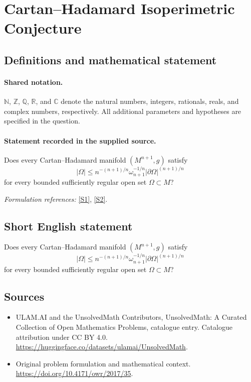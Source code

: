 \documentclass[11pt]{article}
\newcommand{\sref}[2]{\hyperlink{source:#1:#2}{[S#2]}}
\begin{document}
\section{Cartan–Hadamard Isoperimetric Conjecture}\label{statement}

\subsection{Definitions and mathematical statement}

\paragraph{Shared notation.}$\mathbb N$, $\mathbb Z$, $\mathbb Q$, $\mathbb R$, and $\mathbb C$ denote the natural numbers, integers, rationals, reals, and complex numbers, respectively. All additional parameters and hypotheses are specified in the question.


\paragraph{Statement recorded in the supplied source.}
Does every Cartan–Hadamard manifold $(M^{n+1},g)$ satisfy
$$
|\Omega|\leq n^{-(n+1)/n}\omega_{n+1}^{-1/n}|\partial\Omega|^{(n+1)/n}
$$
for every bounded sufficiently regular open set $\Omega\subset M$?
\par\smallskip\textit{Formulation references:} \sref{statement}{1}, \sref{statement}{2}.
\subsection{Short English statement}
Does every Cartan–Hadamard manifold $(M^{n+1},g)$ satisfy
$$
|\Omega|\leq n^{-(n+1)/n}\omega_{n+1}^{-1/n}|\partial\Omega|^{(n+1)/n}
$$
for every bounded sufficiently regular open set $\Omega\subset M$?
\subsection{Sources}
\begin{itemize}
\item[\hypertarget{source:statement:1}{S1}] ULAM.AI and the UnsolvedMath Contributors, UnsolvedMath: A Curated Collection of Open Mathematics Problems, catalogue entry. Catalogue attribution under CC BY 4.0.
\url{https://huggingface.co/datasets/ulamai/UnsolvedMath}.
\item[\hypertarget{source:statement:2}{S2}] Original problem formulation and mathematical context.
\url{https://doi.org/10.4171/owr/2017/35}.
\end{itemize}
\label{end:statement}
\end{document}
